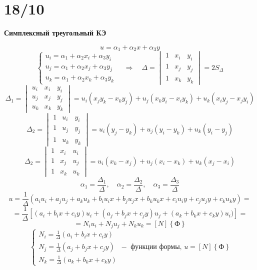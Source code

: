 \documentclass{bmstu}
\begin{document}
	
	\section*{18/10}
	\begin{center}
		\textbf{Симплексный треугольный КЭ}
	\end{center}
	\[
	u=\alpha_1+\alpha_2 x +\alpha_3 y
	\]
	\[
	\begin{cases}
		u_i=\alpha_1+\alpha_2 x_i +\alpha_3 y_i \\
		u_j=\alpha_1+\alpha_2 x_j +\alpha_3 y_j \\
		u_k=\alpha_1+\alpha_2 x_k +\alpha_3 y_k 
	\end{cases} \quad \Rightarrow \quad \Delta = \begin{vmatrix}
	1&x_i&y_i\\
	1&x_j&y_j\\
	1&x_k&y_k
	\end{vmatrix} = 2S_{\Delta}
	\]
	\[
	\Delta_1=\begin{vmatrix}
	u_i&x_i&y_i\\
	u_j&x_j&y_j\\
	u_k&x_k&y_k
	\end{vmatrix}
	 = u_i(x_jy_k-x_ky_j)+u_j(x_ky_i-x_iy_k)+u_k(x_iy_j-x_jy_i)
	\]
	\[
	\Delta_2=\begin{vmatrix}
		1&u_i&y_i\\
		1&u_j&y_j\\
		1&u_k&y_k
	\end{vmatrix}
	= u_i(y_j-y_k)+u_j(y_i-y_k)+u_k(y_i-y_j)
	\]
	\[
	\Delta_2=\begin{vmatrix}
		1&x_i&u_i\\
		1&x_j&u_j\\
		1&x_k&u_k
	\end{vmatrix}
	= u_i(x_k-x_j)+u_j(x_i-x_k)+u_k(x_j-x_i)
	\]
	\[
	\alpha_1 = \frac{\Delta_1}{\Delta}, \quad \alpha_2 = \frac{\Delta_2}{\Delta}, \quad \alpha_3 = \frac{\Delta_3}{\Delta}
	\]
	\[
	u=\frac{1}{\Delta}(a_iu_i+a_ju_j+a_ku_k+b_iu_ix+b_ju_jx+b_ku_kx+c_iu_iy+c_ju_jy+c_ku_ky)=
	\]
	\[
	=\frac{1}{\Delta}\left[(a_i+b_ix+c_iy)u_i+(a_j+b_jx+c_jy)u_j+(a_k+b_kx+c_ky)u_i)\right]=
	\]
	\[
	=N_iu_i+N_ju_j+N_ku_k=\left[N\right]\left\{\text{Ф}\right\}
	\]
	\[
	\begin{cases}
		N_i = \frac{1}{\Delta}(a_i+b_ix+c_iy) \\
		N_j = \frac{1}{\Delta}(a_j+b_jx+c_jy) \\
		N_k = \frac{1}{\Delta}(a_k+b_kx+c_ky) 
	\end{cases} - \text{ функции формы, } u=\left[N\right]\left\{\text{Ф}\right\}
	\]
	
\end{document}
